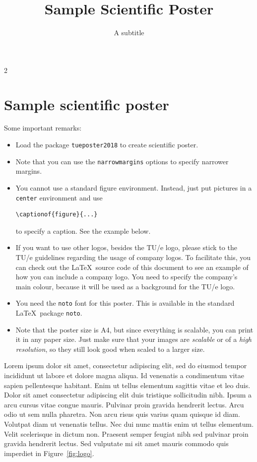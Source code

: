\documentclass[a4paper,10pt]{article}
\title{Sample Scientific Poster}
\subtitle{A subtitle}
\begin{document}
\maketitle

\begin{multicols}{2}
\section*{Sample scientific poster}

Some important remarks:
\begin{itemize}
\item Load the package \verb|tueposter2018| to create scientific poster.
\item Note that you can use the \verb|narrowmargins| options to specify narrower margins.
\item You cannot use a standard figure environment. Instead, just put pictures in a \verb|center| environment and use
\begin{verbatim}
\captionof{figure}{...}
\end{verbatim}
to specify a caption. See the example below.
\item If you want to use other logos, besides the TU/e logo, please stick to the TU/e guidelines regarding the usage of company logos. To facilitate this, you can check out the \LaTeX\ source code of this document to see an example of how you can include a company logo. You need to specify the company's main colour, because it will be used as a background for the TU/e logo.
\item You need the \verb|noto| font for this poster. This is available in the standard \LaTeX\ package \verb|noto|.
\item Note that the poster size is A4, but since everything is scalable, you can print it in any paper size. Just make sure that your images are \emph{scalable} or of a \emph{high resolution}, so they still look good when scaled to a larger size.
\end{itemize}

Lorem ipsum dolor sit amet, consectetur adipiscing elit, sed do eiusmod tempor incididunt ut labore et dolore magna aliqua. Id venenatis a condimentum vitae sapien pellentesque habitant. Enim ut tellus elementum sagittis vitae et leo duis. Dolor sit amet consectetur adipiscing elit duis tristique sollicitudin nibh. Ipsum a arcu cursus vitae congue mauris. Pulvinar proin gravida hendrerit lectus. Arcu odio ut sem nulla pharetra. Non arcu risus quis varius quam quisque id diam. Volutpat diam ut venenatis tellus. Nec dui nunc mattis enim ut tellus elementum. Velit scelerisque in dictum non. Praesent semper feugiat nibh sed pulvinar proin gravida hendrerit lectus. Sed vulputate mi sit amet mauris commodo quis imperdiet  in Figure~\ref{fig:logo}.


\end{multicols}
\end{document}
